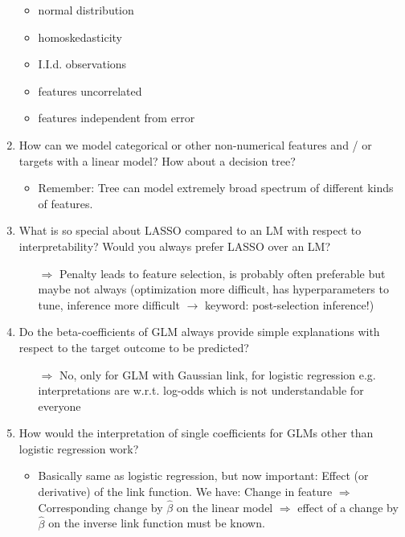 \begin{enumerate}
        \begin{itemize}
            \item normal distribution
            \item homoskedasticity
            \item I.I.d. observations
            \item features uncorrelated
            \item features independent from error
        \end{itemize}
        \item How can we model categorical or other non-numerical features and / or targets with a linear model? How about a decision tree?
        \begin{itemize}
            \item Remember: Tree can model extremely broad spectrum of different kinds of features.
        \end{itemize}
    	\item What is so special about LASSO compared to an LM with respect to interpretability? Would you always prefer LASSO over an LM?
    	\begin{itemize}
    		\item[$\Rightarrow$] Penalty leads to feature selection, is probably often preferable but maybe not always (optimization more difficult, has hyperparameters to tune, inference more difficult $\rightarrow$ keyword: post-selection inference!)
    	\end{itemize}
    	\item Do the beta-coefficients of GLM always provide simple explanations with respect to the target outcome to be predicted? 
    	\begin{itemize}
    		\item[$\Rightarrow$] No, only for GLM with Gaussian link, for logistic regression e.g. interpretations are w.r.t. log-odds which is not understandable for everyone
    	\end{itemize}
        \item How would the interpretation of single coefficients for GLMs other than logistic regression work?
        \begin{itemize}
            \item Basically same as logistic regression, but now important: Effect (or derivative) of the link function.
            We have: Change in feature $\Rightarrow$ Corresponding change by $\hat{\beta}$ on the linear model $\Rightarrow$ effect of a change by $\hat{\beta}$ on the inverse link function must be known.

\end{itemize}
\end{enumerate}
